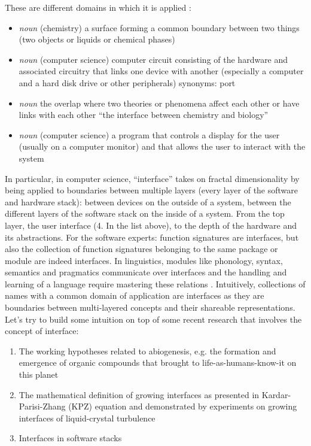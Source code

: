 \documentclass[14pt,a4paper]{extarticle}
\begin{document}
These are different domains in which it is applied \cite{VocabInterface}:
\begin{itemize}
\item \textit{noun} (chemistry) a surface forming a common boundary between two things (two objects or liquids or chemical phases)
\item \textit{noun}  (computer science) computer circuit consisting of the hardware and associated circuitry that links one device with another (especially a computer and a hard disk drive or other peripherals) synonyms: port            
\item \textit{noun}  the overlap where two theories or phenomena affect each other or have links with each other “the interface between chemistry and biology”        
\item \textit{noun}  (computer science) a program that controls a display for the user (usually on a computer monitor) and that allows the user to interact with the system
\end{itemize}
In particular, in computer science, “interface” takes on fractal dimensionality by being applied to boundaries between multiple layers (every layer of the software and hardware stack): between devices on the outside of a system, between the different layers of the software stack on the inside of a system. From the top layer, the user interface (4. In the list above), to the depth of the hardware and its abstractions.
\newline
For the software experts: function signatures are interfaces, but also the collection of function signatures belonging to the same package or module are indeed interfaces.
\newline
\hspace*{15mm}In linguistics, modules like phonology, syntax, semantics and pragmatics communicate over interfaces and the handling and learning of a language require mastering these relations \cite{Lanthi2006}. Intuitively, collections of names with a common domain of application are interfaces as they are boundaries between multi-layered concepts and their shareable representations.
\newline
\hspace*{15mm}Let’s try to build some intuition on top of some recent research that involves the concept of interface:

\begin{enumerate}
\item The working hypotheses related to abiogenesis, e.g. the formation and emergence of organic compounds that brought to life-as-humans-know-it on this planet \cite{lingam2021life}
\item The mathematical definition of growing interfaces as presented in Kardar-Parisi-Zhang (KPZ) equation and demonstrated by experiments on growing interfaces of liquid-crystal turbulence \cite{PhysRevLett.56.889,Takeuchi2011}
\item Interfaces in software stacks
\end{enumerate}
\end{document}
